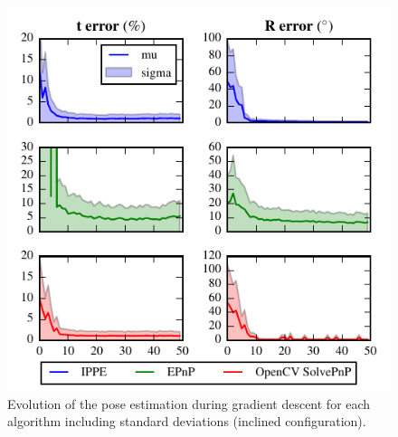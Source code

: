 \documentclass[letterpaper, 10 pt, conference]{ieeeconf}  %
\begin{document}
\begin{figure}[t]
  \begin{center}
    \includegraphics[width=\columnwidth]{img/pose_separate_inclined.pdf}
    \caption{\label{fig:homography_results} Evolution of the pose estimation during gradient descent for each algorithm including standard deviations (inclined configuration).}
  \end{center}
\end{figure}


\end{document}
